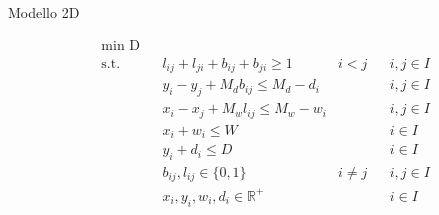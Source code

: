 \documentclass{beamer}
\begin{document}
\begin{frame}{Modello 2D}
	\begin{center}
		\begin{align*}
			& \underset{}{\text{min D}} \\
			  & \text{s.t.} &   & l_{ij} + l_{ji} + b_{ij} + b_{ji} \geq 1      & i < j    &   & i,j \in I \\
			  &             &   & y_i - y_j + M_d b_{ij} \leq M_d - d_i         &          &   & i,j \in I \\
			  &             &   & x_i - x_j + M_w l_{ij} \leq M_w - w_i         &          &   & i,j \in I \\
			  &             &   & x_i + w_i \leq W                              &          &   & i \in I   \\
			  &             &   & y_i + d_i \leq D                              &          &   & i \in I   \\
			  &             &   & b_{ij}, l_{ij} \in \{0,1\}                    & i \neq j &   & i,j \in I \\
			  &             &   & x_{i}, y_{i}, w_{i}, d_{i} \in \mathbb{R}^{+} &          &   & i \in I   
		\end{align*}
	\end{center}
	
\end{frame}
\end{document}
